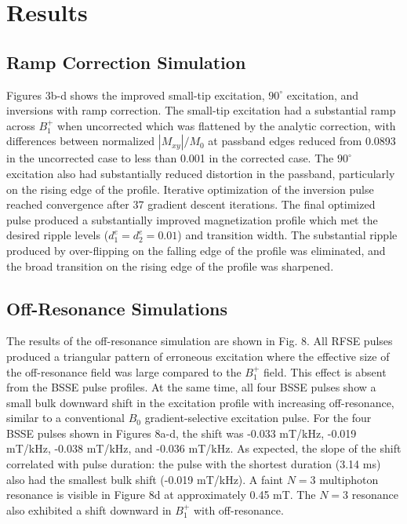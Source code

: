 \documentclass[a4paper,12pt]{article}
\begin{document}
\section*{Results}
\subsection*{Ramp Correction Simulation}
Figures 3b-d shows the improved small-tip excitation, 
$90^\circ$ excitation, and inversions with ramp correction. 
The small-tip excitation had a substantial ramp across $B_1^+$ when uncorrected 
which was flattened by the analytic correction, 
with differences between normalized $|M_{xy}|/M_0$ at passband edges reduced from 0.0893 in the uncorrected case to less than 0.001 in the corrected case. 
The $90^\circ$ excitation also had substantially reduced distortion
in the passband, 
particularly on the rising edge of the profile. 
Iterative optimization of the inversion pulse reached convergence after 37 gradient descent iterations. 
The final optimized pulse produced a substantially improved magnetization profile which met the desired ripple levels ($d_1^e=d_2^e=0.01$) and transition width. 
The substantial ripple produced by over-flipping on the falling edge of the profile was eliminated, 
and the broad transition on the rising edge of the profile was sharpened. 

\subsection*{Off-Resonance Simulations}
The results of the off-resonance simulation are shown in Fig. 8. 
All RFSE pulses produced a triangular pattern of erroneous excitation 
where the effective size of the off-resonance field was large compared to the $B_1^+$ field.
This effect is absent from the BSSE pulse profiles. 
At the same time, 
all four BSSE pulses show a small 
bulk downward shift in the excitation profile with increasing off-resonance,
similar to  a conventional $B_0$ gradient-selective excitation pulse. 
For the four BSSE pulses shown in Figures 8a-d, 
the shift was -0.033 mT/kHz, -0.019 mT/kHz, -0.038 mT/kHz, and -0.036 mT/kHz. 
As expected, the slope of the shift correlated with pulse duration: 
the pulse with the shortest duration (3.14 ms) also had the smallest bulk shift (-0.019 mT/kHz). 
A faint $N=3$ multiphoton resonance is visible in Figure 8d at approximately 0.45 mT. 
The $N=3$ resonance also exhibited a shift downward in $B_1^+$ with off-resonance.
\end{document}
